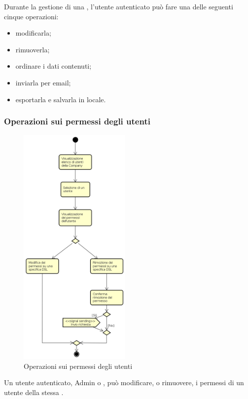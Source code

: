 Durante la gestione di una , l'utente autenticato può fare una delle seguenti cinque operazioni:
\begin{itemize}
\item modificarla;
\item rimuoverla;
\item ordinare i dati contenuti;
\item inviarla per email;
\item esportarla e salvarla in locale.
\end{itemize}
\subsubsection{Operazioni sui permessi degli utenti}
\begin{figure}[H]
\begin{center}
\includegraphics[height=12cm]{res/sections/backend/activities/operazioniSuUtenti.png}
\caption{Operazioni sui permessi degli utenti}
\end{center}
\end{figure}
Un utente autenticato, Admin o , può modificare, o rimuovere, i permessi di un utente della stessa .
